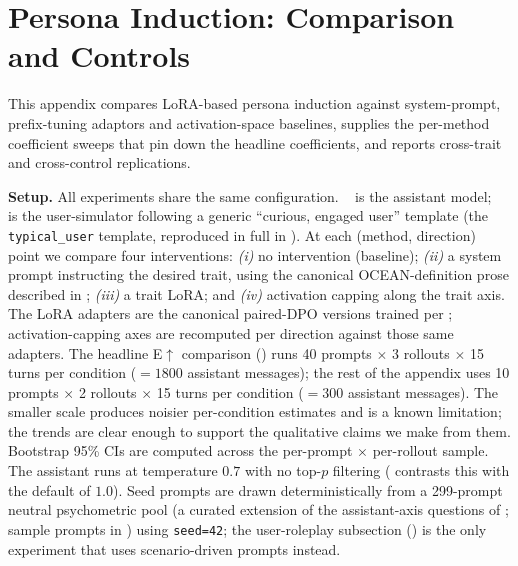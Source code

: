 \section{Persona Induction: Comparison and Controls}\label{sec:appendix-induction-sweeps}

This appendix compares LoRA-based persona induction against system-prompt, prefix-tuning adaptors and activation-space baselines, supplies the per-method coefficient sweeps that pin down the headline coefficients, and reports cross-trait and cross-control replications.

\textbf{Setup.} All experiments share the same configuration. \LlamaThreePointOneSizeEightBInstruct~\citep{grattafiori2024llama} is the assistant model; \GPTFourPointOneMini~\citep{openai2025gpt41} is the user-simulator following a generic ``curious, engaged user'' template (the \texttt{typical\_user} template, reproduced in full in ). At each (method, direction) point we compare four interventions: \emph{(i)} no intervention (baseline); \emph{(ii)} a system prompt instructing the desired trait, using the canonical OCEAN-definition prose described in ; \emph{(iii)} a trait LoRA; and \emph{(iv)} activation capping along the trait axis. The LoRA adapters are the canonical paired-DPO versions trained per ; activation-capping axes are recomputed per direction against those same adapters. The headline E$\uparrow$ comparison () runs 40 prompts $\times$ 3 rollouts $\times$ 15 turns per condition ($= 1800$ assistant messages); the rest of the appendix uses 10 prompts $\times$ 2 rollouts $\times$ 15 turns per condition ($= 300$ assistant messages). The smaller scale produces noisier per-condition estimates and is a known limitation; the trends are clear enough to support the qualitative claims we make from them. Bootstrap 95\% CIs are computed across the per-prompt $\times$ per-rollout sample. The assistant runs at temperature $0.7$ with no top-$p$ filtering ( contrasts this with the default of $1.0$). Seed prompts are drawn deterministically from a 299-prompt neutral psychometric pool (a curated extension of the assistant-axis questions of \citet{lu2026assistant}; sample prompts in ) using \texttt{seed=42}; the user-roleplay subsection () is the only experiment that uses scenario-driven prompts instead.


